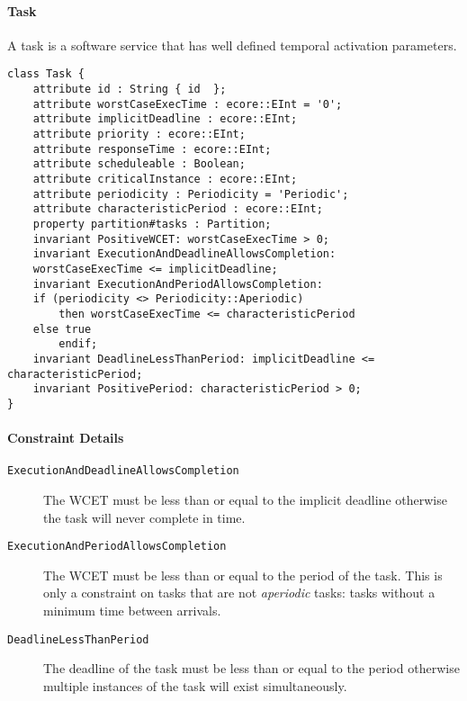 \paragraph{Task}
A task is a software service that has well defined temporal activation parameters.
\begin{lstlisting}[caption=Task constraints]
class Task {
    attribute id : String { id  };
    attribute worstCaseExecTime : ecore::EInt = '0';
    attribute implicitDeadline : ecore::EInt;
    attribute priority : ecore::EInt;
    attribute responseTime : ecore::EInt;
    attribute scheduleable : Boolean;
    attribute criticalInstance : ecore::EInt;
    attribute periodicity : Periodicity = 'Periodic';
    attribute characteristicPeriod : ecore::EInt;
    property partition#tasks : Partition;
    invariant PositiveWCET: worstCaseExecTime > 0;
    invariant ExecutionAndDeadlineAllowsCompletion:
    worstCaseExecTime <= implicitDeadline;
    invariant ExecutionAndPeriodAllowsCompletion: 
    if (periodicity <> Periodicity::Aperiodic)
        then worstCaseExecTime <= characteristicPeriod
    else true
        endif;
    invariant DeadlineLessThanPeriod: implicitDeadline <= characteristicPeriod;
    invariant PositivePeriod: characteristicPeriod > 0;
}
\end{lstlisting}
\paragraph{Constraint Details} 
\begin{description}
\item[\texttt{ExecutionAndDeadlineAllowsCompletion}] The WCET must be less than or equal to the implicit deadline otherwise the task will never complete in time.
\item[\texttt{ExecutionAndPeriodAllowsCompletion}] The WCET must be less than or equal to the period of the task. This is only a constraint on tasks that are not 
\textit{aperiodic} tasks: tasks without a minimum time between arrivals.
\item[\texttt{DeadlineLessThanPeriod}] The deadline of the task must be less than or equal to the period otherwise multiple instances of the task will exist simultaneously.
\end{description}
